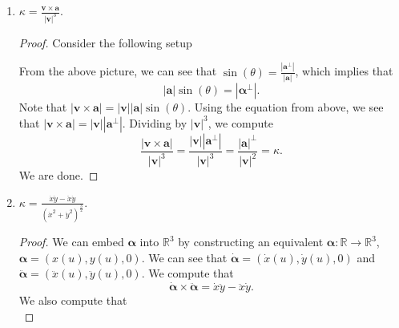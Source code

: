 \documentclass[12pt]{article}
\newcommand{\magnitude}[1]{\left\lvert #1 \right\rvert}
\begin{document}
\begin{enumerate}[label=\Alph*., leftmargin=*]
    \item $\kappa =\frac{\bm{v}\times \bm{a}}{{\vert \bm{v}\vert}^3}.$ \begin{proof}
      Consider the following setup
      \begin{center}
    \end{center}
    From the above picture, we can see that $\sin(\theta)=\frac{\magnitude{\bm{a}^{\perp}}}{\magnitude{\bm{a}}}$, which implies that \begin{equation*}
      \magnitude{\bm{a}}\sin(\theta)=\magnitude{\bm{\alpha}^{\perp}}.
    \end{equation*}
     Note that $\magnitude{\bm{v}\times\bm{a}}=\magnitude{\bm{v}}\magnitude{\bm{a}}\sin(\theta)$. Using the equation from above, we see that $\magnitude{\bm{v}\times\bm{a}}=\magnitude{\bm{v}}\magnitude{\bm{a}^{\perp}}$. Dividing by $\magnitude{\bm{v}}^3$, we compute\begin{equation*}
      \frac{\magnitude{\bm{v}\times\bm{a}}}{\magnitude{\bm{v}}^3}=\frac{\magnitude{\bm{v}}\magnitude{\bm{a}^{\perp}}}{\magnitude{\bm{v}}^3}=\frac{\magnitude{\bm{a}}^{\perp}}{\magnitude{\bm{v}}^2}=\kappa.
     \end{equation*}
     We are done.
    \end{proof}
    \item $\kappa = \frac{\dot{x}\ddot{y}-\ddot{x}\dot{y}}{{(\dot{x}^2+\dot{y}^2)}^{\frac{3}{2}}}$.\begin{proof}
    We can embed $\bm{\alpha}$ into $\mathbb{R}^3$ by constructing an equivalent $\bm{\alpha}: \mathbb{R}\rightarrow\mathbb{R}^3$, $\bm{\alpha}=(x(u),y(u),0)$. We can see that $\bm{\dot{\alpha}}=(\dot{x}(u),\dot{y}(u),0)$ and $\bm{\ddot{\alpha}}=(\ddot{x}(u),\ddot{y}(u),0)$. 
    We compute that\begin{equation*}
      \bm{\dot{\alpha}}\times \bm{\ddot{\alpha}}=\dot{x}\ddot{y}-\ddot{x}\dot{y}.
    \end{equation*}
    We also compute that\begin{equation*}

\end{equation*}
\end{proof}
\end{enumerate}
\end{document}

